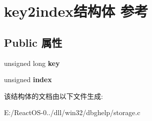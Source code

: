 \hypertarget{structkey2index}{}\section{key2index结构体 参考}
\label{structkey2index}
\subsection*{Public 属性}
\begin{DoxyCompactItemize}
\item 
\mbox{\label{structkey2index_acbf294a00cd046d0ce27218f82b2b282}} 
unsigned long {\bfseries key}
\item 
\mbox{\label{structkey2index_a3e3b0f2ebe3150af83c5459c307a628d}} 
unsigned {\bfseries index}
\end{DoxyCompactItemize}


该结构体的文档由以下文件生成\+:\begin{DoxyCompactItemize}
\item 
E\+:/\+React\+O\+S-\/0../dll/win32/dbghelp/storage.\+c\end{DoxyCompactItemize}
